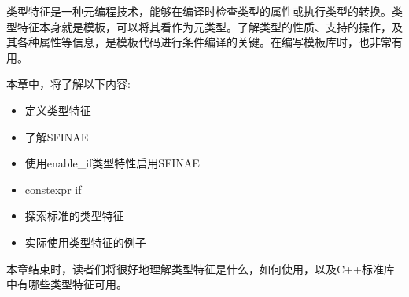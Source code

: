 类型特征是一种元编程技术，能够在编译时检查类型的属性或执行类型的转换。类型特征本身就是模板，可以将其看作为元类型。了解类型的性质、支持的操作，及其各种属性等信息，是模板代码进行条件编译的关键。在编写模板库时，也非常有用。

本章中，将了解以下内容:

\begin{itemize}
\item
定义类型特征

\item
了解SFINAE

\item
使用enable\_if类型特性启用SFINAE

\item
constexpr if

\item
探索标准的类型特征

\item
实际使用类型特征的例子
\end{itemize}

本章结束时，读者们将很好地理解类型特征是什么，如何使用，以及C++标准库中有哪些类型特征可用。




























